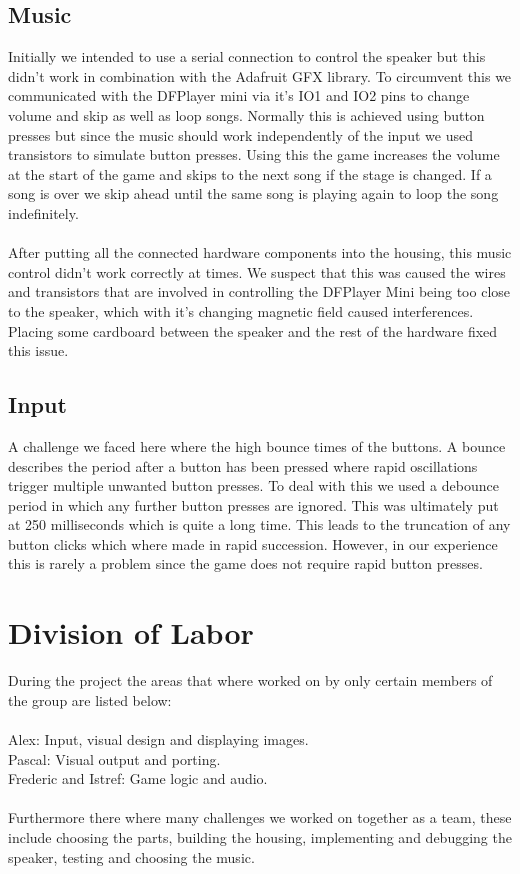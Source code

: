 \documentclass[10pt, a4paper]{article}
\begin{document}
\subsection*{Music}
Initially we intended to use a serial connection to control the speaker but this didn't work in combination with the Adafruit GFX library. To circumvent this we communicated with the DFPlayer mini via it's IO1 and IO2 pins to change volume and skip as well as loop songs. Normally this is achieved using button presses but since the music should work independently of the input we used transistors to simulate button presses. Using this the game increases the volume at the start of the game and skips to the next song if the stage is changed. If a song is over we skip ahead until the same song is playing again to loop the song indefinitely. \\\\
After putting all the connected hardware components into the housing, this music control didn't work correctly at times. We suspect that this was caused the wires and transistors that are involved in controlling the DFPlayer Mini being too close to the speaker, which with it's changing magnetic field caused interferences. Placing some cardboard between the speaker and the rest of the hardware fixed this issue. 

\subsection*{Input}
A challenge we faced here where the high bounce times of the buttons. A bounce describes the period after a button has been pressed where rapid oscillations trigger multiple unwanted button presses. To deal with this we used a debounce period in which any further button presses are ignored. This was ultimately put at 250 milliseconds which is quite a long time. This leads to the truncation of any button clicks which where made in rapid succession. However, in our experience this is rarely a problem since the game does not require rapid button presses. 

\section*{Division of Labor}
During the project the areas that where worked on by only certain members of the group are listed below:\\\\
Alex: Input, visual design and displaying images.\\
Pascal: Visual output and porting.\\
Frederic and Istref: Game logic and audio.\\\\
Furthermore there where many challenges we worked on together as a team, these include choosing the parts, building the housing, implementing and debugging the speaker, testing and choosing the music.
\end{document}
